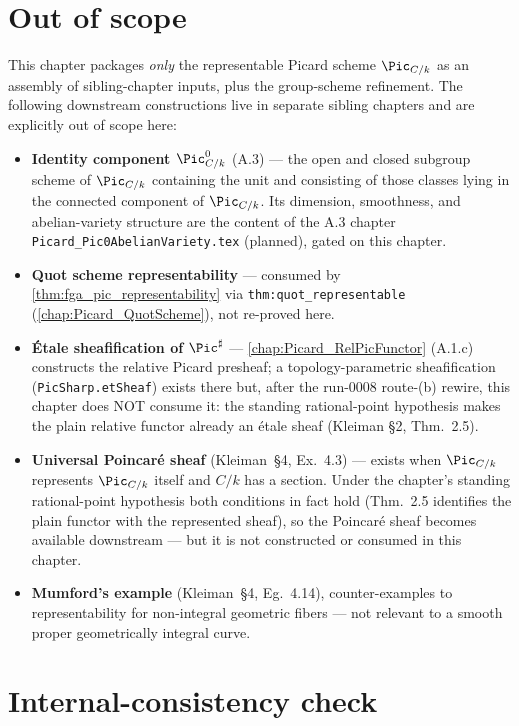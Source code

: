 \section{Out of scope}
\label{sec:fga_pic_out_of_scope}

This chapter packages \emph{only} the representable Picard scheme
\(\Pic_{C/k}\) as an assembly of sibling-chapter inputs, plus the
group-scheme refinement. The following downstream constructions live in
separate sibling chapters and are explicitly out of scope here:
\begin{itemize}
  \item \textbf{Identity component \(\Pic^0_{C/k}\)} (A.3) --- the open and
    closed subgroup scheme of \(\Pic_{C/k}\) containing the unit and
    consisting of those classes lying in the connected component of
    \(\Pic_{C/k}\). Its dimension, smoothness, and abelian-variety
    structure are the content of the A.3 chapter
    \texttt{Picard\_Pic0AbelianVariety.tex} (planned), gated on this
    chapter.
  \item \textbf{Quot scheme representability} --- consumed by
    \cref{thm:fga_pic_representability} via \texttt{thm:quot\_representable}
    (\cref{chap:Picard_QuotScheme}), not re-proved here.
  \item \textbf{\'Etale sheafification of \(\Pic^\sharp\)} ---
    \cref{chap:Picard_RelPicFunctor} (A.1.c) constructs the relative
    Picard presheaf; a topology-parametric sheafification
    (\texttt{PicSharp.etSheaf}) exists there but, after the run-0008
    route-(b) rewire, this chapter does NOT consume it: the standing
    rational-point hypothesis makes the plain relative functor already an
    \'etale sheaf (Kleiman \S 2, Thm.~2.5).
  \item \textbf{Universal Poincar\'e sheaf} (Kleiman~\S 4, Ex.~4.3)
    --- exists when \(\Pic_{C/k}\) represents \(\Pic_{C/k}\) itself and
    \(C/k\) has a section. Under the chapter's standing rational-point
    hypothesis both conditions in fact hold (Thm.~2.5 identifies the
    plain functor with the represented sheaf), so the Poincar\'e sheaf
    becomes available downstream --- but it is not constructed or
    consumed in this chapter.
  \item \textbf{Mumford's example} (Kleiman~\S 4, Eg.~4.14), counter-examples
    to representability for non-integral geometric fibers --- not
    relevant to a smooth proper geometrically integral curve.
\end{itemize}

\section{Internal-consistency check}
\label{sec:fga_pic_consistency_check}

